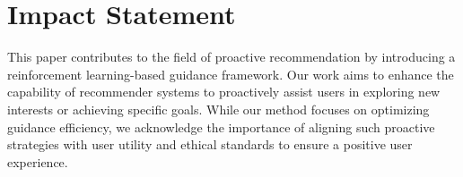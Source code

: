 \section*{Impact Statement}

This paper contributes to the field of proactive recommendation by introducing a reinforcement learning-based guidance framework. Our work aims to enhance the capability of recommender systems to proactively assist users in exploring new interests or achieving specific goals. While our method focuses on optimizing guidance efficiency, we acknowledge the importance of aligning such proactive strategies with user utility and ethical standards to ensure a positive user experience.